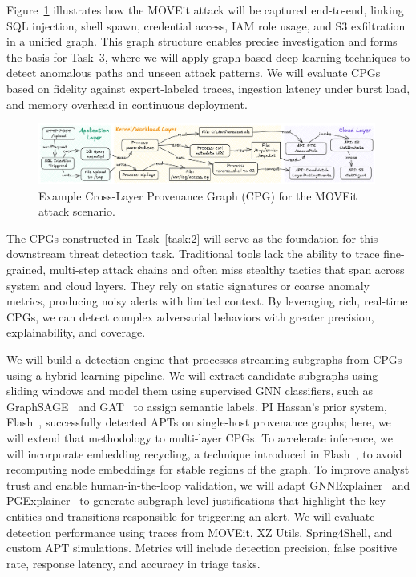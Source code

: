 Figure~\ref{fig:example:cpg} illustrates how the MOVEit attack will be captured end-to-end, linking SQL injection, shell spawn, credential access, IAM role usage, and S3 exfiltration in a unified graph. This graph structure enables precise investigation and forms the basis for Task~3, where we will apply graph-based deep learning techniques to detect anomalous paths and unseen attack patterns. We will evaluate CPGs based on fidelity against expert-labeled traces, ingestion latency under burst load, and memory overhead in continuous deployment.

\begin{figure}[t!]
    \centering \includegraphics[width=0.99\textwidth]{fig/graph-example.png}
    \caption{Example Cross-Layer Provenance Graph (CPG) for the MOVEit attack scenario.}
    \label{fig:example:cpg}
\end{figure}

 The CPGs constructed in Task~\ref{task:2} will serve as the foundation for this downstream threat detection task. Traditional tools lack the ability to trace fine-grained, multi-step attack chains and often miss stealthy tactics that span across system and cloud layers. They rely on static signatures or coarse anomaly metrics, producing noisy alerts with limited context. By leveraging rich, real-time CPGs, we can detect complex adversarial behaviors with greater precision, explainability, and coverage.

We will build a detection engine that processes streaming subgraphs from CPGs using a hybrid learning pipeline. We will extract candidate subgraphs using sliding windows and model them using supervised GNN classifiers, such as GraphSAGE~\cite{lo2022graphsage} and GAT~\cite{velivckovic2017graph} to assign semantic labels. PI Hassan’s prior system, Flash~\cite{flash2024}, successfully detected APTs on single-host provenance graphs; here, we will extend that methodology to multi-layer CPGs. To accelerate inference, we will incorporate embedding recycling, a technique introduced in Flash~\cite{flash2024}, to avoid recomputing node embeddings for stable regions of the graph. To improve analyst trust and enable human-in-the-loop validation, we will adapt GNNExplainer~\cite{ying2019gnnexplainer} and PGExplainer~\cite{luo2020parameterized} to generate subgraph-level justifications that highlight the key entities and transitions responsible for triggering an alert. We will evaluate detection performance using traces from MOVEit, XZ Utils, Spring4Shell, and custom APT simulations. Metrics will include detection precision, false positive rate, response latency, and accuracy in triage tasks.
    
